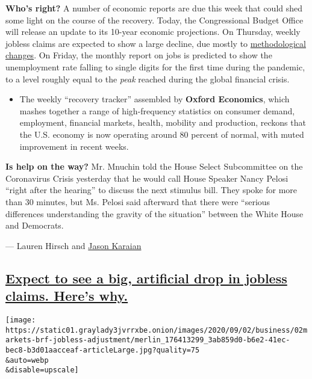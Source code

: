 \textbf{Who's right?} A number of economic reports are due this week
that could shed some light on the course of the recovery. Today, the
Congressional Budget Office will release an update to its 10-year
economic projections. On Thursday, weekly jobless claims are expected to
show a large decline, due mostly to
\href{https://www.nytimes3xbfgragh.onion/live/2020/09/01/business/stock-market-today-coronavirus/the-labor-department-will-start-counting-unemployment-claims-in-a-new-way}{methodological
changes}. On Friday, the monthly report on jobs is predicted to show the
unemployment rate falling to single digits for the first time during the
pandemic, to a level roughly equal to the \emph{peak} reached during the
global financial crisis.

\begin{itemize}
\tightlist
\item
  The weekly ``recovery tracker'' assembled by \textbf{Oxford
  Economics}, which mashes together a range of high-frequency statistics
  on consumer demand, employment, financial markets, health, mobility
  and production, reckons that the U.S. economy is now operating around
  80 percent of normal, with muted improvement in recent weeks.
\end{itemize}

\textbf{Is help on the way?} Mr. Mnuchin told the House Select
Subcommittee on the Coronavirus Crisis yesterday that he would call
House Speaker Nancy Pelosi ``right after the hearing'' to discuss the
next stimulus bill. They spoke for more than 30 minutes, but Ms. Pelosi
said afterward that there were ``serious differences understanding the
gravity of the situation'' between the White House and Democrats.

--- Lauren Hirsch and
\href{https://www.nytimes3xbfgragh.onion/by/jason-karaian}{Jason
Karaian}

\hypertarget{expect-to-see-a-big-artificial-drop-in-jobless-claims-heres-why}{%
\subsection{\texorpdfstring{\protect\hyperlink{expect-to-see-a-big-artificial-drop-in-jobless-claims-heres-why}{Expect
to see a big, artificial drop in jobless claims. Here's
why.}}{Expect to see a big, artificial drop in jobless claims. Here's why.}}\label{expect-to-see-a-big-artificial-drop-in-jobless-claims-heres-why}}

\texttt{[image: https://static01.graylady3jvrrxbe.onion/images/2020/09/02/business/02markets-brf-jobless-adjustment/merlin\_176413299\_3ab859d0-b6e2-41ec-bec8-b3d01aacceaf-articleLarge.jpg?quality=75\\\&auto=webp\\\&disable=upscale]}

